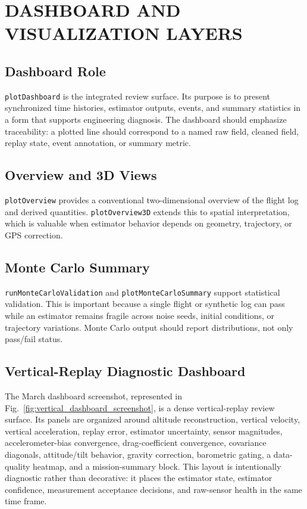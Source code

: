 \documentclass[colorlinks,upint,subscriptcorrection,varvw,hyphenate,balance]{asmeconf}
\newcommand{\code}[1]{\texttt{\allowbreak#1}}
\begin{document}
\section{DASHBOARD AND VISUALIZATION LAYERS}

\subsection{Dashboard Role}
\code{plotDashboard} is the integrated review surface. Its purpose is to present synchronized time histories, estimator outputs, events, and summary statistics in a form that supports engineering diagnosis. The dashboard should emphasize traceability: a plotted line should correspond to a named raw field, cleaned field, replay state, event annotation, or summary metric.

\subsection{Overview and 3D Views}
\code{plotOverview} provides a conventional two-dimensional overview of the flight log and derived quantities. \code{plotOverview3D} extends this to spatial interpretation, which is valuable when estimator behavior depends on geometry, trajectory, or GPS correction.

\subsection{Monte Carlo Summary}
\code{runMonteCarloValidation} and \code{plotMonteCarloSummary} support statistical validation. This is important because a single flight or synthetic log can pass while an estimator remains fragile across noise seeds, initial conditions, or trajectory variations. Monte Carlo output should report distributions, not only pass/fail status.

\subsection{Vertical-Replay Diagnostic Dashboard}
The March dashboard screenshot, represented in Fig.~\ref{fig:vertical_dashboard_screenshot}, is a dense vertical-replay review surface. Its panels are organized around altitude reconstruction, vertical velocity, vertical acceleration, replay error, estimator uncertainty, sensor magnitudes, accelerometer-bias convergence, drag-coefficient convergence, covariance diagonals, attitude/tilt behavior, gravity correction, barometric gating, a data-quality heatmap, and a mission-summary block. This layout is intentionally diagnostic rather than decorative: it places the estimator state, estimator confidence, measurement acceptance decisions, and raw-sensor health in the same time frame.
\end{document}

